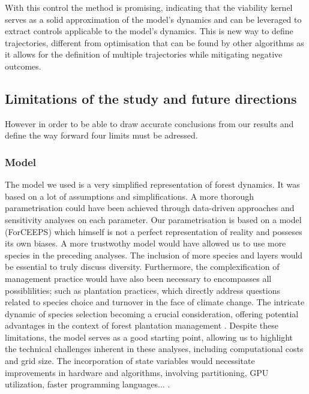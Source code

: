 \documentclass{article}
\begin{document}
With this control the method is promising, indicating that the viability kernel serves as a solid approximation of the model's dynamics and can be leveraged to extract controls applicable to the model's dynamics. This is new way to define trajectories, different from optimisation that can be found by other algorithms \autocite{sinhaOptimalManagementNaturally2017} as it allows for the definition of multiple trajectories while mitigating negative outcomes.

\subsection{Limitations of the study and future directions}

However in order to be able to draw accurate conclusions from our results and define the way forward four limits must be adressed.

\subsubsection{Model}

The model we used is a very simplified representation of forest dynamics. It was based on a lot of assumptions and simplifications. A more  thorough parametrisation could have been achieved through data-driven approaches and sensitivity analyses on each parameter. Our parametrisation is based on a model (ForCEEPS) which himself is not a perfect representation of reality and posseses its own biases. A  more trustwothy model would have allowed us to use more species in the preceding analyses. The inclusion of more species and layers would be essential to truly discuss diversity. Furthermore, the complexification of management practice would have also been necessary to encompasses all possiblilities; such as plantation practices, which directly address questions related to species choice and turnover in the face of climate change. The intricate dynamic of species selection becoming a crucial consideration, offering potential advantages in the context of forest plantation management \autocite{brockerhoffPlantationForestsBiodiversity2008}. Despite these limitations, the model serves as a good starting point, allowing us to highlight the technical challenges inherent in these analyses, including computational costs and grid size. The incorporation of state variables would necessitate improvements in hardware and algorithms, involving partitioning, GPU utilization, faster programming languages... \autocite{briasAcceleratingViabilityKernel2016}.
\end{document}

